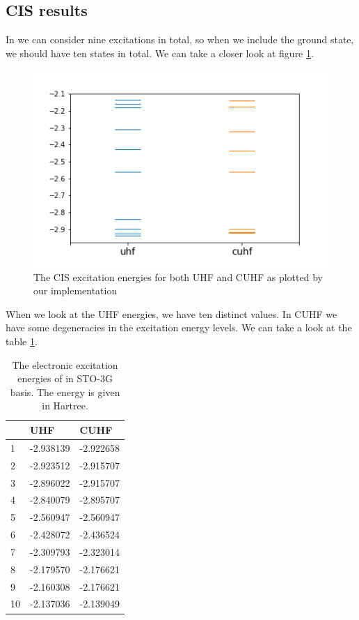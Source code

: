 \documentclass[twoside,twocolumn,9pt]{article}
\begin{document}
\subsection{CIS results}
\label{subsec:cis}
In  we can consider nine excitations in total, so when we include the ground state, we should have ten states in total. We can take a closer look at
figure \ref{fig:h3_cis}.
\begin{center}
  \begin{figure}[h]
    \includegraphics[width=\linewidth]{./../notes/figures/h3_cis.png}
    \caption{The CIS excitation energies for both UHF and CUHF as plotted by our implementation}
    \label{fig:h3_cis}
  \end{figure}
\end{center}
When we look at the UHF energies, we have ten distinct values. In CUHF we have some degeneracies in the excitation energy levels.
We can take a look at the table \ref{tab:excits}.
\begin{table}[h]
  \caption{The electronic excitation energies of  in STO-3G basis. The energy is given in Hartree.}
  \label{tab:excits}
  \begin{tabular}{l|l|l}
       & UHF       & CUHF      \\
    \hline
    1  & -2.938139 & -2.922658 \\
    2  & -2.923512 & -2.915707 \\
    3  & -2.896022 & -2.915707 \\
    4  & -2.840079 & -2.895707 \\
    5  & -2.560947 & -2.560947 \\
    6  & -2.428072 & -2.436524 \\
    7  & -2.309793 & -2.323014 \\
    8  & -2.179570 & -2.176621 \\
    9  & -2.160308 & -2.176621 \\
    10 & -2.137036 & -2.139049
  \end{tabular}
\end{table}
\end{document}
